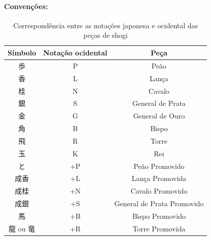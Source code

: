 \documentclass[a4paper, 11pt]{article}
\begin{document}
    \paragraph{Convenções:}
    \begin{table}[H]
        \centering
        \caption{Correspondência entre as notações japonesa e ocidental das peças de shogi}
        \label{tab:shogi_pieces}
        \begin{tabular}{c c c}
            \toprule
            \textbf{Símbolo} & \textbf{Notação ocidental} & \textbf{Peça} \\
            \midrule
            歩 & P & Peão \\
            香 & L  & Lança \\
            桂 & N  & Cavalo \\
            銀 & S  & General de Prata \\
            金 & G  & General de Ouro \\
            角 & B  & Bispo \\
            飛 & R  & Torre \\
            玉 & K  & Rei \\
            と & +P  & Peão Promovido \\
            成香 & +L  & Lança Promovida \\
            成桂 & +N  & Cavalo Promovido \\
            成銀 & +S  & General de Prata Promovido \\
            馬 & +B  & Bispo Promovido \\
            龍 ou 竜 & +R  & Torre Promovida \\
            \bottomrule
        \end{tabular}
    \end{table}
\end{document}
